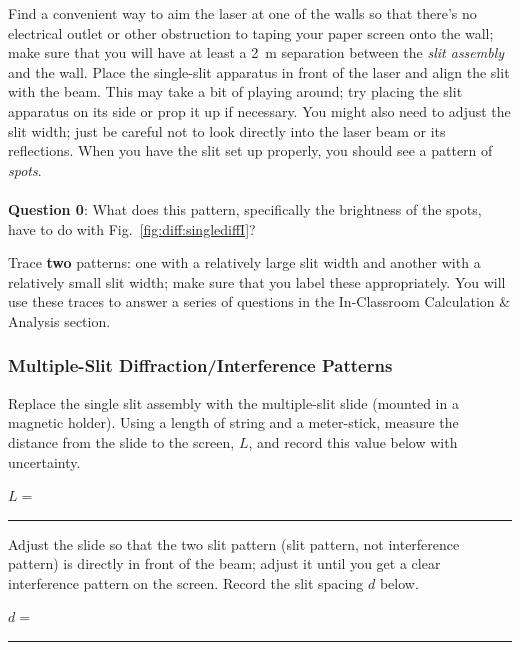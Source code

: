 Find a convenient way to aim the laser at one of the walls so that there's
no electrical outlet or other obstruction to taping your paper screen onto the
wall; make sure that you will have at least a 2~m separation between the 
{\it slit assembly} and the wall.  Place the single-slit apparatus in front of 
the laser and align the slit with the beam. This may take a bit of playing 
around; try placing the slit apparatus on its side or prop it up if necessary. 
You might also need to adjust the slit width; just be careful not to look 
directly into the laser beam or its reflections.  When you have the slit set 
up properly, you should see a pattern of {\it spots}. \\ 
\vspace*{.3cm} \\
{\bf Question 0}: What does this pattern, 
specifically the brightness of the spots, have to do with 
Fig.~\ref{fig:diff:singlediffI}?   \\
\clearpage

\noindent Trace {\bf two} patterns: one with a relatively large slit 
width and another with a 
relatively small slit width; make sure that you label these appropriately.   
You will use these traces to answer a series of questions in the In-Classroom
Calculation \& Analysis section.  


\subsubsection{Multiple-Slit Diffraction/Interference Patterns} 
\label{sec:diff:multislitproc}

\noindent Replace the single slit assembly with the multiple-slit slide
(mounted in a magnetic holder). Using a length of string and a meter-stick, 
measure the distance from the slide to the screen, $L$, and record this value
below with uncertainty.
\begin{center}
$L=$~ \rule{3cm}{.1mm} 
\end{center}
Adjust the slide
so that the two slit pattern (slit pattern, not interference pattern) is 
directly in front of the beam; adjust it until you get a clear interference 
pattern on the screen. Record the slit spacing $d$ below.

\begin{center}
$d=$~ \rule{3cm}{.1mm}
\end{center}
\vspace*{.5cm}

